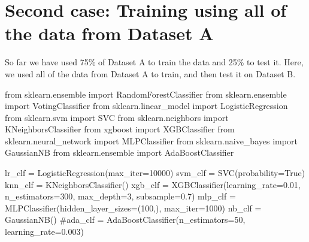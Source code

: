 \documentclass[
  letterpaper,
  DIV=11,
  numbers=noendperiod]{scrartcl}
\newenvironment{Shaded}{\begin{snugshade}}{\end{snugshade}}
\newcommand{\CommentTok}[1]{\textcolor[rgb]{0.37,0.37,0.37}{#1}}
\newcommand{\DecValTok}[1]{\textcolor[rgb]{0.68,0.00,0.00}{#1}}
\newcommand{\FloatTok}[1]{\textcolor[rgb]{0.68,0.00,0.00}{#1}}
\newcommand{\ImportTok}[1]{\textcolor[rgb]{0.00,0.46,0.62}{#1}}
\newcommand{\NormalTok}[1]{\textcolor[rgb]{0.00,0.23,0.31}{#1}}
\newcommand{\OperatorTok}[1]{\textcolor[rgb]{0.37,0.37,0.37}{#1}}
\newcommand{\VariableTok}[1]{\textcolor[rgb]{0.07,0.07,0.07}{#1}}
\begin{document}
\hypertarget{second-case-training-using-all-of-the-data-from-dataset-a}{%
\section{Second case: Training using all of the data from Dataset
A}\label{second-case-training-using-all-of-the-data-from-dataset-a}}

So far we have used 75\% of Dataset A to train the data and 25\% to test
it. Here, we used all of the data from Dataset A to train, and then test
it on Dataset B.

\begin{Shaded}
\begin{Highlighting}[]
\ImportTok{from}\NormalTok{ sklearn.ensemble }\ImportTok{import}\NormalTok{ RandomForestClassifier}
\ImportTok{from}\NormalTok{ sklearn.ensemble }\ImportTok{import}\NormalTok{ VotingClassifier}
\ImportTok{from}\NormalTok{ sklearn.linear\_model }\ImportTok{import}\NormalTok{ LogisticRegression}
\ImportTok{from}\NormalTok{ sklearn.svm }\ImportTok{import}\NormalTok{ SVC}
\ImportTok{from}\NormalTok{ sklearn.neighbors }\ImportTok{import}\NormalTok{ KNeighborsClassifier}
\ImportTok{from}\NormalTok{ xgboost }\ImportTok{import}\NormalTok{ XGBClassifier}
\ImportTok{from}\NormalTok{ sklearn.neural\_network }\ImportTok{import}\NormalTok{ MLPClassifier}
\ImportTok{from}\NormalTok{ sklearn.naive\_bayes }\ImportTok{import}\NormalTok{ GaussianNB}
\ImportTok{from}\NormalTok{ sklearn.ensemble }\ImportTok{import}\NormalTok{ AdaBoostClassifier}

\NormalTok{lr\_clf }\OperatorTok{=}\NormalTok{ LogisticRegression(max\_iter}\OperatorTok{=}\DecValTok{10000}\NormalTok{)}
\NormalTok{svm\_clf }\OperatorTok{=}\NormalTok{ SVC(probability}\OperatorTok{=}\VariableTok{True}\NormalTok{)}
\NormalTok{knn\_clf }\OperatorTok{=}\NormalTok{ KNeighborsClassifier()}
\NormalTok{xgb\_clf }\OperatorTok{=}\NormalTok{ XGBClassifier(learning\_rate}\OperatorTok{=}\FloatTok{0.01}\NormalTok{, n\_estimators}\OperatorTok{=}\DecValTok{300}\NormalTok{, max\_depth}\OperatorTok{=}\DecValTok{3}\NormalTok{, subsample}\OperatorTok{=}\FloatTok{0.7}\NormalTok{)}
\NormalTok{mlp\_clf }\OperatorTok{=}\NormalTok{ MLPClassifier(hidden\_layer\_sizes}\OperatorTok{=}\NormalTok{(}\DecValTok{100}\NormalTok{,), max\_iter}\OperatorTok{=}\DecValTok{1000}\NormalTok{)}
\NormalTok{nb\_clf }\OperatorTok{=}\NormalTok{ GaussianNB()}
\CommentTok{\#ada\_clf = AdaBoostClassifier(n\_estimators=50, learning\_rate=0.003)}


\end{Highlighting}
\end{Shaded}
\end{document}
